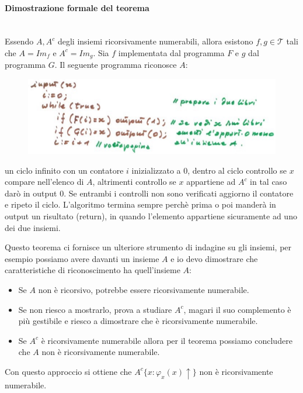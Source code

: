 \documentclass{article}
\begin{document}
\paragraph{Dimostrazione formale del teorema}\mbox{}\\
Essendo $A,A^c$ degli insiemi ricorsivamente numerabili, allora
esistono $f,g\in\mathcal{T}$ tali che $A=Im_f$ e $A^c=Im_g$. Sia $f$ implementata
dal programma $F$ e $g$ dal programma $G$. Il seguente programma riconosce $A$:
\begin{figure}[H]
    \centering
    \includegraphics[scale=0.5]{images/prog_per_a.png}
\end{figure}
un ciclo infinito con un contatore $i$ inizializzato a 0, dentro al ciclo controllo
se $x$ compare nell'elenco di $A$, altrimenti controllo se $x$ appartiene ad $A^c$
in tal caso darò in output 0. Se entrambi i controlli non sono verificati
aggiorno il contatore e ripeto il ciclo.
L'algoritmo termina sempre perchè prima o poi manderà in output un risultato (return),
in quando l'elemento appartiene sicuramente ad uno dei due insiemi.

Questo teorema ci fornisce un ulteriore strumento di indagine su gli insiemi, per esempio
possiamo avere davanti un insieme $A$ e io devo dimostrare che caratteristiche
di riconoscimento ha quell'insieme $A$:
\begin{itemize}
    \item Se $A$ non è ricorsivo, potrebbe essere ricorsivamente numerabile.
    \item Se non riesco a mostrarlo, prova a studiare $A^c$, magari il suo complemento
          è più gestibile e riesco a dimostrare che è ricorsivamente numerabile.
    \item Se $A^c$ è ricorsivamente numerabile allora per il teorema possiamo concludere che
          $A$ non è ricorsivamente numerabile.
\end{itemize}
Con questo approccio si ottiene che $A^c\{x:\varphi_x(x)\uparrow\}$ non è ricorsivamente
numerabile.
\end{document}
